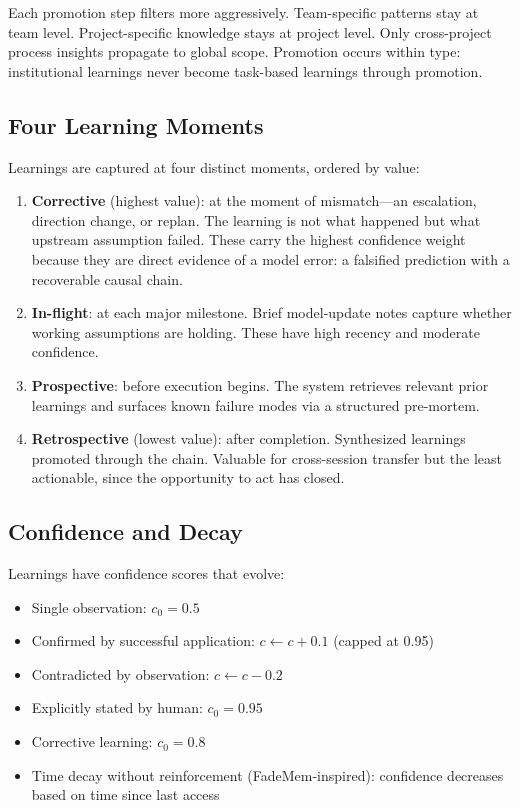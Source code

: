 \documentclass[11pt,a4paper]{article}
\begin{document}
Each promotion step filters more aggressively. Team-specific patterns
stay at team level. Project-specific knowledge stays at project level.
Only cross-project process insights propagate to global scope.
Promotion occurs within type: institutional learnings never become
task-based learnings through promotion.

\subsection{Four Learning Moments}

Learnings are captured at four distinct moments, ordered by value:

\begin{enumerate}
    \item \textbf{Corrective} (highest value): at the moment of
    mismatch---an escalation, direction change, or replan. The
    learning is not what happened but what upstream assumption failed.
    These carry the highest confidence weight because they are direct
    evidence of a model error: a falsified prediction with a
    recoverable causal chain.

    \item \textbf{In-flight}: at each major milestone. Brief
    model-update notes capture whether working assumptions are holding.
    These have high recency and moderate confidence.

    \item \textbf{Prospective}: before execution begins. The system
    retrieves relevant prior learnings and surfaces known failure modes
    via a structured pre-mortem.

    \item \textbf{Retrospective} (lowest value): after completion.
    Synthesized learnings promoted through the chain. Valuable for
    cross-session transfer but the least actionable, since the
    opportunity to act has closed.
\end{enumerate}

\subsection{Confidence and Decay}

Learnings have confidence scores that evolve:

\begin{itemize}
    \item Single observation: $c_0 = 0.5$
    \item Confirmed by successful application: $c \gets c + 0.1$
    (capped at 0.95)
    \item Contradicted by observation: $c \gets c - 0.2$
    \item Explicitly stated by human: $c_0 = 0.95$
    \item Corrective learning: $c_0 = 0.8$
    \item Time decay without reinforcement (FadeMem-inspired):
    confidence decreases based on time since last access
\end{itemize}
\end{document}
